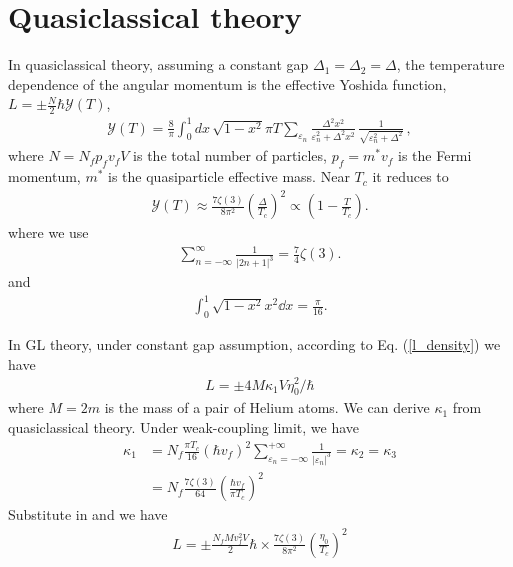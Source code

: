 \documentclass[aps,prl,preprint]{revtex4-2}
\begin{document}
\section{Quasiclassical theory}
In quasiclassical theory, assuming a constant gap $\Delta_1=\Delta_2=\Delta$,
the temperature dependence of the angular momentum is
the effective Yoshida function, $L=\pm \frac{N}{2}\hbar\mathcal{Y}(T)$,
\begin{align}
    \mathcal{Y}(T) = \frac{8}{\pi} \int_{0}^{1} dx \, \sqrt{1 - x^2} \pi T
    \sum_{\varepsilon_n}
    \frac{\Delta^2 x^2}{\varepsilon_n^2 + \Delta^2 x^2} \,
    \frac{1}{\sqrt{\varepsilon_n^2 + \Delta^2}} \, ,
\end{align}
where $N=N_fp_fv_fV$ is the total number of particles,
$p_f=m^*v_f$ is the Fermi momentum,
$m^*$ is the quasiparticle effective mass.
Near $T_c$ it reduces to
\begin{align}
    \mathcal{Y}(T)\approx\frac{7\zeta(3)}{8\pi^2}
    \left(\frac{\Delta}{T_c}\right)^2\propto \left(1-\frac{T}{T_c}\right).
\end{align}
where we use
\begin{align}
    \sum_{n=-\infty}^\infty\frac{1}{|2n+1|^3}=\frac{7}{4}\zeta(3).
\end{align}
and
\begin{align}
    \int_0^1\sqrt{1-x^2}x^2\dd x=\frac{\pi}{16}.
\end{align}

In GL theory, under constant gap assumption, according to Eq. (\ref{l_density}) we have
\begin{align}
    L=\pm 4M\kappa_1 V\eta_0^2/\hbar
\end{align}
where $M=2m$ is the mass of a pair of Helium atoms.
We can derive $\kappa_1$ from quasiclassical theory. Under weak-coupling limit, we have
\begin{align}
    \kappa_1 & =N_f\frac{\pi T_c}{16}(\hbar v_f)^2
    \sum_{\varepsilon_n=-\infty}^{+\infty}\frac{1}{|\varepsilon_n|^3}=\kappa_2=\kappa_3 \\
             & =N_f\frac{7\zeta(3)}{64}\left(\frac{\hbar v_f}{\pi T_c}\right)^2
\end{align}
Substitute in and we have
\begin{align}
    L=\pm \frac{N_fMv_f^2V}{2}\hbar\times\frac{7\zeta(3)}{8\pi^2}\left(\frac{\eta_0}{T_c}\right)^2
\end{align}
\end{document}
